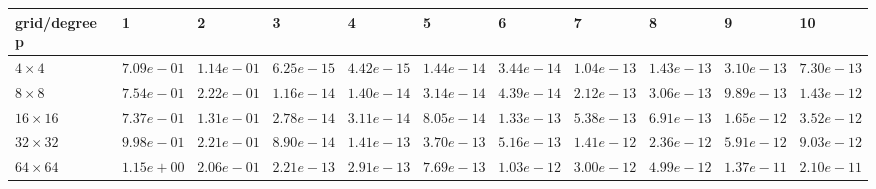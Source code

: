 \begin{tabular}{lllllllllll}
\hline
 grid/degree p   & 1          & 2          & 3          & 4          & 5          & 6          & 7          & 8          & 9          & 10         \\
\hline
 $4 \times 4$    & $7.09e-01$ & $1.14e-01$ & $6.25e-15$ & $4.42e-15$ & $1.44e-14$ & $3.44e-14$ & $1.04e-13$ & $1.43e-13$ & $3.10e-13$ & $7.30e-13$ \\
 $8 \times 8$    & $7.54e-01$ & $2.22e-01$ & $1.16e-14$ & $1.40e-14$ & $3.14e-14$ & $4.39e-14$ & $2.12e-13$ & $3.06e-13$ & $9.89e-13$ & $1.43e-12$ \\
 $16 \times 16$  & $7.37e-01$ & $1.31e-01$ & $2.78e-14$ & $3.11e-14$ & $8.05e-14$ & $1.33e-13$ & $5.38e-13$ & $6.91e-13$ & $1.65e-12$ & $3.52e-12$ \\
 $32 \times 32$  & $9.98e-01$ & $2.21e-01$ & $8.90e-14$ & $1.41e-13$ & $3.70e-13$ & $5.16e-13$ & $1.41e-12$ & $2.36e-12$ & $5.91e-12$ & $9.03e-12$ \\
 $64 \times 64$  & $1.15e+00$ & $2.06e-01$ & $2.21e-13$ & $2.91e-13$ & $7.69e-13$ & $1.03e-12$ & $3.00e-12$ & $4.99e-12$ & $1.37e-11$ & $2.10e-11$ \\
\hline
\end{tabular}